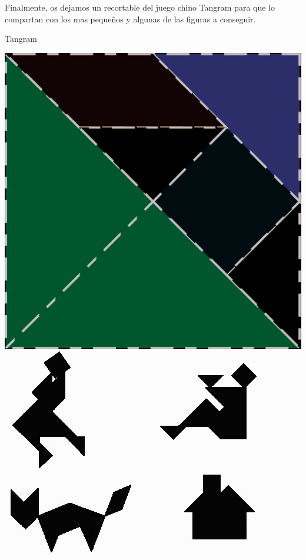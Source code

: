 Finalmente, os dejamos un recortable del juego chino Tangram para que lo compartan con los mas pequeños y algunas de las figuras a conseguir. 
\vspace{-0.3cm}
\begin{center}
\huge{\textcolor{bluesol}{Tangram}}

\includegraphics [scale=0.2]{Tangram.jpg} \includegraphics[scale=0.6]{tan7.jpg}
\end{center}

\newpage




